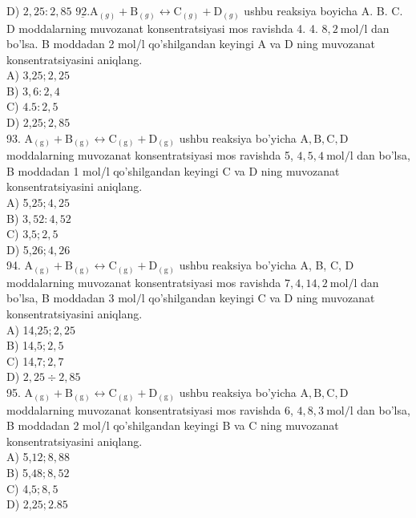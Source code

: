 D) $2,25: 2,85$
$\underline{92 .} \mathrm{A}_{(g)}+\mathrm{B}_{(g)} \leftrightarrow \mathrm{C}_{(g)}+\mathrm{D}_{(g)}$ ushbu reaksiya boyicha A. B. C. D moddalarning muvozanat konsentratsiyasi mos ravishda 4. 4. $8,2 \mathrm{~mol} / \mathrm{l}$ dan bo'lsa. B moddadan 2 mol/l qo'shilgandan keyingi A va D ning muvozanat konsentratsiyasini aniqlang.\\
A) 3,$25 ; 2,25$\\
B) $3,6: 2,4$\\
C) $4.5: 2,5$\\
D) 2,$25 ; 2,85$\\
93. $\mathrm{A}_{(\mathrm{g})}+\mathrm{B}_{(\mathrm{g})} \leftrightarrow \mathrm{C}_{(\mathrm{g})}+\mathrm{D}_{(\mathrm{g})}$ ushbu reaksiya bo'yicha $\mathrm{A}, \mathrm{B}, \mathrm{C}, \mathrm{D}$ moddalarning muvozanat konsentratsiyasi mos ravishda 5, $4,5,4 \mathrm{~mol} / \mathrm{l}$ dan bo'lsa, B moddadan 1 mol/l qo'shilgandan keyingi C va D ning muvozanat konsentratsiyasini aniqlang.\\
A) 5,$25 ; 4,25$\\
B) $3,52: 4,52$\\
C) 3,$5 ; 2,5$\\
D) 5,$26 ; 4,26$\\
94. $\mathrm{A}_{(\mathrm{g})}+\mathrm{B}_{(\mathrm{g})} \leftrightarrow \mathrm{C}_{(\mathrm{g})}+\mathrm{D}_{(\mathrm{g})}$ ushbu reaksiya bo'yicha A, B, C, D moddalarning muvozanat konsentratsiyasi mos ravishda $7,4,14,2 \mathrm{~mol} / \mathrm{l}$ dan bo'lsa, B moddadan 3 $\mathrm{mol} / \mathrm{l}$ qo'shilgandan keyingi C va D ning muvozanat konsentratsiyasini aniqlang.\\
A) 14,$25 ; 2,25$\\
B) 14,$5 ; 2,5$\\
C) 14,$7 ; 2,7$\\
D) $2,25 \div 2,85$\\
95. $\mathrm{A}_{(\mathrm{g})}+\mathrm{B}_{(\mathrm{g})} \leftrightarrow \mathrm{C}_{(\mathrm{g})}+\mathrm{D}_{(\mathrm{g})}$ ushbu reaksiya bo'yicha $\mathrm{A}, \mathrm{B}, \mathrm{C}, \mathrm{D}$ moddalarning muvozanat konsentratsiyasi mos ravishda 6, $4,8,3 \mathrm{~mol} / \mathrm{l}$ dan bo'lsa, B moddadan 2 mol/l qo'shilgandan keyingi B va C ning muvozanat konsentratsiyasini aniqlang.\\
A) 5,$12 ; 8,88$\\
B) 5,$48 ; 8,52$\\
C) 4,$5 ; 8,5$\\
D) 2,$25 ; 2.85$\\

